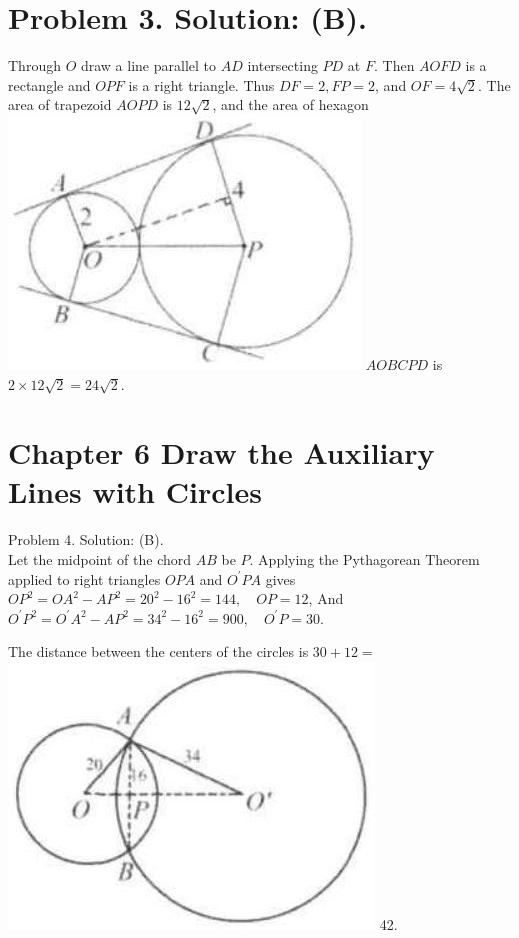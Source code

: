 \documentclass[10pt]{article}
\begin{document}
\section*{Problem 3. Solution: (B).}
Through \(O\) draw a line parallel to \(A D\) intersecting \(P D\) at \(F\). Then \(A O F D\) is a rectangle and \(O P F\) is a right triangle. Thus \(D F=2, F P=2\), and \(O F=4 \sqrt{2}\). The area of trapezoid \(A O P D\) is \(12 \sqrt{2}\), and the area of hexagon\\
\includegraphics[max width=\textwidth]{2025_04_17_97bc1f7e44d93c271a88g-187} \(A O B C P D\) is \(2 \times 12 \sqrt{2}=24 \sqrt{2}\).

\section*{Chapter 6 Draw the Auxiliary Lines with Circles}
Problem 4. Solution: (B).\\
Let the midpoint of the chord \(A B\) be \(P\). Applying the Pythagorean Theorem applied to right triangles \(O P A\) and \(O^{\prime} P A\) gives\\
\(O P^{2}=O A^{2}-A P^{2}=20^{2}-16^{2}=144, \quad O P=12\), And \(O^{\prime} P^{2}=O^{\prime} A^{2}-A P^{2}=34^{2}-16^{2}=900, \quad O^{\prime} P=30\).

The distance between the centers of the circles is \(30+12=\)\\
\includegraphics[max width=\textwidth]{2025_04_17_97bc1f7e44d93c271a88g-188(1)} 42.
\end{document}
